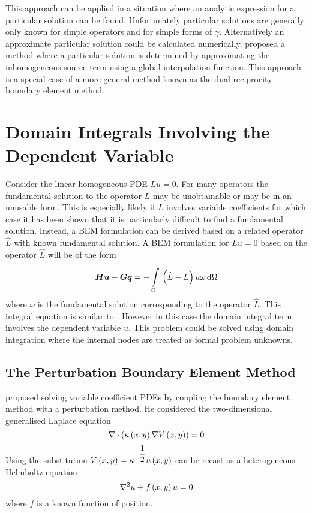 This approach can be applied in a situation where an analytic expression
for a particular solution can be found.  Unfortunately particular solutions
are generally only known for simple operators and for simple forms of
$\gamma$.  Alternatively an approximate particular solution could be
calculated numerically.  \citet{zheng:1991} proposed a method
where a particular solution is determined by approximating the
inhomogeneous source term using a global interpolation function.  This
approach is a special case of a more general method known as the dual
reciprocity boundary element method.

\section{Domain Integrals Involving the Dependent Variable}

Consider the linear homogeneous PDE $Lu = 0$.  For many operators the
fundamental solution to the operator $L$ may be unobtainable or may be in
an unusable form.  This is especially likely if $L$ involves variable
coefficients for which case it has been shown that it is particularly
difficult to find a fundamental solution.  Instead, a BEM formulation can
be derived based on a related operator $\hat{L}$ with known fundamental
solution.  A BEM formulation for $Lu = 0$ based on the operator $\hat{L}$
will be of the form
\begin{equation}
  \matr{H} \vect{u} - \matr{G} \vect{q} 
            = -\goneint{\pbrac{\hat{L} - L} u \omega}{\Omega}
\label{eq:relate}
\end{equation}
where $\omega$ is the fundamental solution corresponding to the operator 
$\hat{L}$. This integral equation is similar to .  
However in this case the domain integral term involves the dependent
variable $u$.  This problem could be solved using domain integration where
the internal nodes are treated as formal problem unknowns. 

\subsection{The Perturbation Boundary Element Method}

\citet{rangogni:1986} proposed solving variable coefficient PDEs by
coupling the boundary element method with a perturbation method. He
considered the two-dimensional generalised Laplace equation
\begin{equation}
  \nabla \cdot \left(   \kappa\left( x,y \right) \nabla V\left( x,y \right)   \right) = 0
\label{eq:rangge2}
\end{equation}
Using the substitution $ V\left( x,y \right)  = \kappa^{-\dfrac{1}{2}}  u\left( x,y \right) $
 can be recast as a heterogeneous Helmholtz equation
\begin{equation}
  \laplacian{}{u} + \fnof{f}{x,y}u = 0
\label{eq:varhelm2}
\end{equation}
where $f$ is a known function of position.

